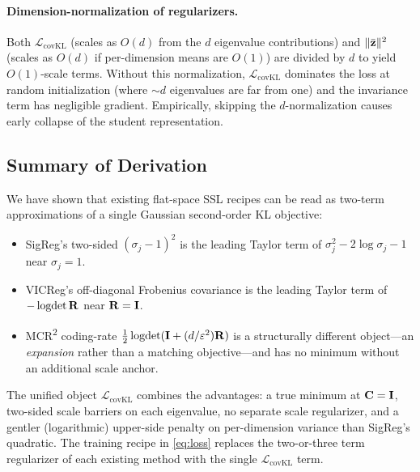 \paragraph{Dimension-normalization of regularizers.}
Both $\mathcal{L}_\text{covKL}$ (scales as $O(d)$ from the $d$ eigenvalue contributions) and $\|\bar{\mathbf{z}}\|^2$ (scales as $O(d)$ if per-dimension means are $O(1)$) are divided by $d$ to yield $O(1)$-scale terms. Without this normalization, $\mathcal{L}_\text{covKL}$ dominates the loss at random initialization (where $\sim d$ eigenvalues are far from one) and the invariance term has negligible gradient. Empirically, skipping the $d$-normalization causes early collapse of the student representation.

\subsection{Summary of Derivation}

We have shown that existing flat-space SSL recipes can be read as two-term approximations of a single Gaussian second-order KL objective:
\begin{itemize}
    \item SigReg's two-sided $(\sigma_j - 1)^2$ is the leading Taylor term of $\sigma_j^2 - 2\log\sigma_j - 1$ near $\sigma_j = 1$.
    \item VICReg's off-diagonal Frobenius covariance is the leading Taylor term of $-\operatorname{logdet}\mathbf{R}$ near $\mathbf{R} = \mathbf{I}$.
    \item MCR\textsuperscript{2} coding-rate $\tfrac{1}{2}\operatorname{logdet}(\mathbf{I} + (d/\varepsilon^2)\mathbf{R})$ is a structurally different object---an \emph{expansion} rather than a matching objective---and has no minimum without an additional scale anchor.
\end{itemize}
The unified object $\mathcal{L}_\text{covKL}$ combines the advantages: a true minimum at $\mathbf{C} = \mathbf{I}$, two-sided scale barriers on each eigenvalue, no separate scale regularizer, and a gentler (logarithmic) upper-side penalty on per-dimension variance than SigReg's quadratic. The training recipe in \eqref{eq:loss} replaces the two-or-three term regularizer of each existing method with the single $\mathcal{L}_\text{covKL}$ term.

